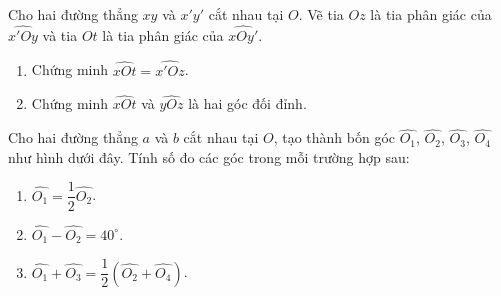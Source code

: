 \begin{bt}
	Cho hai đường thẳng $xy$ và $x'y'$ cắt nhau tại $O$. Vẽ tia $Oz$ là
	tia phân giác của $\widehat{x'Oy}$ và tia $Ot$ là tia phân giác của
	$\widehat{xOy'}$.
	
	\begin{enumerate}[label=\alph*)]
		\item Chứng minh $\widehat{xOt}=\widehat{x'Oz}$.
		
		\item Chứng minh $\widehat{xOt}$ và $\widehat{yOz}$ là hai góc đối đỉnh.
	\end{enumerate}
\end{bt}

\begin{bt}
	Cho hai đường thẳng $a$ và $b$ cắt nhau tại $O$, tạo thành bốn góc
	$\widehat{O_1}$, $\widehat{O_2}$, $\widehat{O_3}$, $\widehat{O_4}$
	như hình dưới đây. Tính số đo các góc trong mỗi trường hợp sau:

	\begin{flushright}
	\end{flushright}

	\begin{enumerate}[label=\alph*)]
		\item $\widehat{O_1}=\dfrac{1}{2}\widehat{O_2}$.
		
		\item $\widehat{O_1}-\widehat{O_2}=40^\circ$.
		
		\item $\widehat{O_1}+\widehat{O_3}
		=\dfrac{1}{2}\left(\widehat{O_2}+\widehat{O_4}\right)$.
	\end{enumerate}
\end{bt}

